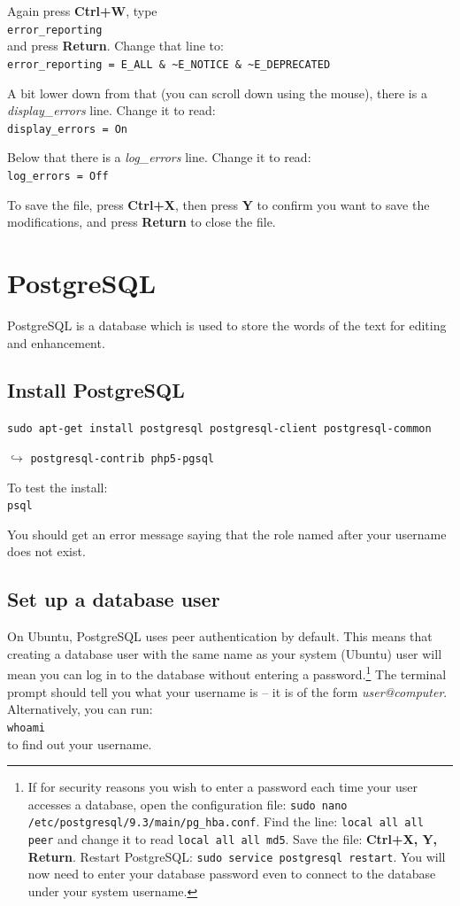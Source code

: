 Again press \textbf{Ctrl+W}, type\\
\verb|error_reporting| \\
and press \textbf{Return}. Change that line to: \\
\verb|error_reporting = E_ALL & ~E_NOTICE & ~E_DEPRECATED|

A bit lower down from that (you can scroll down using the mouse), there is a \textit{display\_errors} line. Change it to read: \\
\verb|display_errors = On|

Below that there is a \textit{log\_errors} line. Change it to read: \\
\verb|log_errors = Off|

To save the file, press \textbf{Ctrl+X}, then press \textbf{Y} to confirm you want to save the modifications, and press \textbf{Return} to close the file.


\section{PostgreSQL}

PostgreSQL is a database which is used to store the words of the text for editing and enhancement.


\subsection{Install PostgreSQL}

\verb|sudo apt-get install postgresql postgresql-client postgresql-common|

$\hookrightarrow$ \verb|postgresql-contrib php5-pgsql|

To test the install:\\
\verb|psql|

You should get an error message saying that the role named after your username does not exist.


\subsection{Set up a database user}
\label{ss:dbuser}

On Ubuntu, PostgreSQL uses peer authentication by default.  This means that creating a database user with the same name as your system (Ubuntu) user will mean you can log in to the database without entering a password.\footnote{If for security reasons you wish to enter a password each time your user accesses a database, open the configuration file: \texttt{sudo nano /etc/postgresql/9.3/main/pg_hba.conf}.  Find the line: \texttt{local all all peer} and change it to read \texttt{local all all md5}.  Save the file: \textbf{Ctrl+X, Y, Return}.  Restart PostgreSQL: \texttt{sudo service postgresql restart}.  You will now need to enter your database password even to connect to the database under your system username.}  The terminal prompt should tell you what your username is -- it is of the form \textit{user@computer}.  Alternatively, you can run:\\
\verb|whoami|\\
to find out your username.

